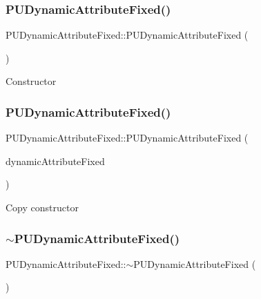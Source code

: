 \subsubsection{\texorpdfstring{P\+U\+Dynamic\+Attribute\+Fixed()}{PUDynamicAttributeFixed()}\hspace{0.1cm}{\footnotesize\ttfamily [3/4]}}
{\footnotesize\ttfamily P\+U\+Dynamic\+Attribute\+Fixed\+::\+P\+U\+Dynamic\+Attribute\+Fixed (\begin{DoxyParamCaption}\item[{void}]{ }\end{DoxyParamCaption})}

Constructor \mbox{\label{classPUDynamicAttributeFixed_a4705fa94353f186ea52aa6a1183e9635}} 
\subsubsection{\texorpdfstring{P\+U\+Dynamic\+Attribute\+Fixed()}{PUDynamicAttributeFixed()}\hspace{0.1cm}{\footnotesize\ttfamily [4/4]}}
{\footnotesize\ttfamily P\+U\+Dynamic\+Attribute\+Fixed\+::\+P\+U\+Dynamic\+Attribute\+Fixed (\begin{DoxyParamCaption}\item[{const \hyperlink{classPUDynamicAttributeFixed}{P\+U\+Dynamic\+Attribute\+Fixed} \&}]{dynamic\+Attribute\+Fixed }\end{DoxyParamCaption})}

Copy constructor \mbox{\label{classPUDynamicAttributeFixed_a80fa3c4db1f9e8404eb1680715ca801e}} 
\subsubsection{\texorpdfstring{$\sim$\+P\+U\+Dynamic\+Attribute\+Fixed()}{~PUDynamicAttributeFixed()}\hspace{0.1cm}{\footnotesize\ttfamily [2/2]}}
{\footnotesize\ttfamily P\+U\+Dynamic\+Attribute\+Fixed\+::$\sim$\+P\+U\+Dynamic\+Attribute\+Fixed (\begin{DoxyParamCaption}\item[{void}]{ }\end{DoxyParamCaption})}

